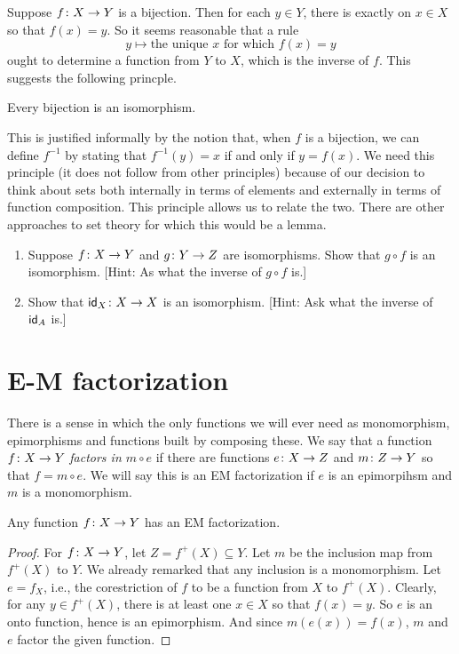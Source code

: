 Suppose ${f}\colon{X}\to{Y}$ is a bijection. Then for each $y\in Y$, there is exactly on $x\in X$ so that $f(x)=y$. So it seems reasonable that a rule 
\[y\mapsto \text{the unique $x$ for which $f(x)=y$}\]
ought to determine a function from $Y$ to $X$, which is the inverse of $f$. This suggests the following princple.

\begin{principle}
	Every bijection is an isomorphism.
\end{principle}

This is justified informally by the notion that, when $f$ is a bijection,
we can define $f^{-1}$ by stating that $f^{-1}(y)=x$ if and only if $y=f(x)$. 
We need this principle (it does not follow from other principles) because of our decision to think about sets both internally in terms of elements and externally in terms of function composition. 
This principle allows us to relate the two.
There are other approaches to set theory for which this would be a lemma.

\begin{exercises}
	\begin{enumerate}
		\item Suppose ${f}\colon{X}\to{Y}$ and ${g}\colon{Y}\to{Z}$ are isomorphisms. Show that $g\circ f$ is an isomorphism. [Hint: As what the inverse of $g\circ f$ is.]
		\item Show that ${\textsf{id}_X}\colon{X}\to{X}$ is an isomorphism. [Hint: Ask what the inverse of $\textsf{id}_A$ is.]
	\end{enumerate}
\end{exercises}

\section{E-M factorization}

There is a sense in which the only functions we will ever need as monomorphism, epimorphisms and functions built by composing these. We say that a function
${f}\colon{X}\to{Y}$ \emph{factors in $m\circ e$} if there are functions ${e}\colon{X}\to{Z}$
and ${m}\colon{Z}\to{Y}$ so that $f=m\circ e$. We will say this is an EM factorization if $e$ is an epimorpihsm and $m$ is a monomorphism.

\begin{lemma}
	Any function ${f}\colon{X}\to{Y}$ has an EM factorization.
	
	\begin{proof}
		For ${f}\colon{X}\to{Y}$, let $Z = f^+(X)\subseteq Y$. Let $m$ be the inclusion map from $f^+(X)$ to $Y$. We already remarked that any inclusion is a monomorphism. Let $e = f_X$, i.e., the corestriction of $f$ to be a function from $X$ to $f^+(X)$. Clearly, for any $y\in f^+(X)$, there is at least one $x\in X$ so that $f(x)=y$. So $e$ is an onto function, hence is an epimorphism. And since $m(e(x))= f(x)$, $m$ and $e$ factor the given function.
	\end{proof}
\end{lemma}



